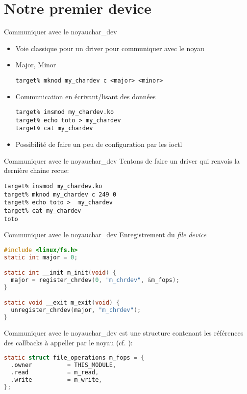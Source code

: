 \section{Notre premier device}

\begin{frame}[fragile=singleslide]{Communiquer avec le noyau}{char\_dev}
  \begin{itemize}
  \item Voie classique pour un driver pour communiquer avec le noyau
  \item Major, Minor
    \begin{lstlisting}
target% mknod my_chardev c <major> <minor>
    \end{lstlisting}
  \item Communication en écrivant/lisant des données
    \begin{lstlisting}
target% insmod my_chardev.ko
target% echo toto > my_chardev
target% cat my_chardev
    \end{lstlisting}
  \item Possibilité de faire un peu de configuration par les ioctl
  \end{itemize}
\end{frame}

\begin{frame}[fragile=singleslide]{Communiquer avec le noyau}{char\_dev}
  Tentons de faire un driver qui renvois la dernière chaine recue:
  \begin{lstlisting}
target% insmod my_chardev.ko
target% mknod my_chardev c 249 0
target% echo toto >  my_chardev
target% cat my_chardev
toto
  \end{lstlisting}
\end{frame}

\begin{frame}[fragile=singleslide]{Communiquer avec le noyau}{char\_dev}
  Enregistrement du \emph{file device}
  \begin{lstlisting}[language=c]
#include <linux/fs.h>
static int major = 0;

static int __init m_init(void) {
  major = register_chrdev(0, "m_chrdev", &m_fops);
}

static void __exit m_exit(void) {
  unregister_chrdev(major, "m_chrdev");
}

  \end{lstlisting}
\end{frame}

\begin{frame}[fragile=singleslide]{Communiquer avec le noyau}{char\_dev}
   est une structure contenant les références des callbacks à appeller par le noyau (cf. ):
  \begin{lstlisting}[language=c]
static struct file_operations m_fops = {
  .owner          = THIS_MODULE,
  .read           = m_read,
  .write          = m_write,
};
  \end{lstlisting}
\end{frame}

